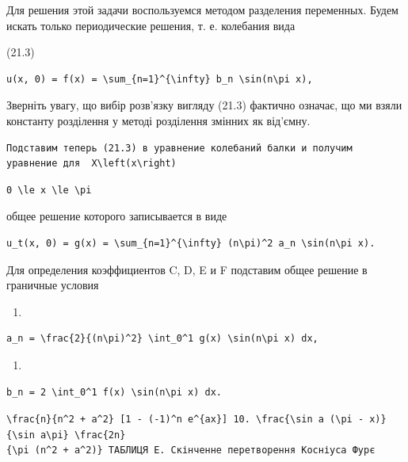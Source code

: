 \documentclass[
  ukrainian,
]{article}
\providecommand{\tightlist}{%
  \setlength{\itemsep}{0pt}\setlength{\parskip}{0pt}}
\begin{document}
Для решения этой задачи воспользуемся методом разделения переменных.
Будем искать только периодические решения, т. е. колебания вида

(21.3)

\begin{verbatim}
u(x, 0) = f(x) = \sum_{n=1}^{\infty} b_n \sin(n\pi x),
\end{verbatim}

Зверніть увагу, що вибір розв'язку вигляду (21.3) фактично означає, що
ми взяли константу розділення у методі розділення змінних як від'ємну.

\begin{verbatim}
Подставим теперь (21.3) в уравнение колебаний балки и получим уравнение для  X\left(x\right)
\end{verbatim}

\begin{verbatim}
0 \le x \le \pi
\end{verbatim}

общее решение которого записывается в виде

\begin{verbatim}
u_t(x, 0) = g(x) = \sum_{n=1}^{\infty} (n\pi)^2 a_n \sin(n\pi x).
\end{verbatim}

Для определения коэффициентов C, D, E и F подставим общее решение в
граничные условия

\begin{enumerate}
\def\labelenumi{\arabic{enumi}.}
\tightlist
\item
\end{enumerate}

\begin{verbatim}
a_n = \frac{2}{(n\pi)^2} \int_0^1 g(x) \sin(n\pi x) dx,
\end{verbatim}

\begin{enumerate}
\def\labelenumi{\arabic{enumi}.}
\setcounter{enumi}{8}
\tightlist
\item
\end{enumerate}

\begin{verbatim}
b_n = 2 \int_0^1 f(x) \sin(n\pi x) dx.
\end{verbatim}

\texttt{\textquotesingle{}\textbackslash{}frac\{n\}\{n\^{}2\ +\ a\^{}2\}\ {[}1\ -\ (-1)\^{}n\ e\^{}\{ax\}{]}\textquotesingle{}\ 10.\ \textquotesingle{}\textbackslash{}frac\{\textbackslash{}sin\ a\ (\textbackslash{}pi\ -\ x)\}\{\textbackslash{}sin\ a\textbackslash{}pi\}\textquotesingle{}\ \textquotesingle{}\textbackslash{}frac\{2n\}\{\textbackslash{}pi\ (n\^{}2\ +\ a\^{}2)\}\textquotesingle{}\ ТАБЛИЦЯ\ E.\ Скінченне\ перетворення\ Косніуса\ Фур\textquotesingle{}є}
\end{document}
